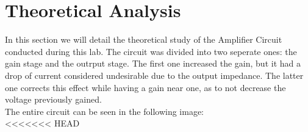 \section{Theoretical Analysis}
\label{sec:analysis}

In this section we will detail the theoretical study of the Amplifier Circuit conducted during this lab. The circuit was divided into two seperate ones: the gain stage and the outrput stage. The first one increased the gain, but it had a drop of current considered undesirable due to the output impedance. The latter one corrects this effect while having a gain near one, as to not decrease the voltage previously gained.\\
The entire circuit can be seen in the following image:\\


<<<<<<< HEAD

